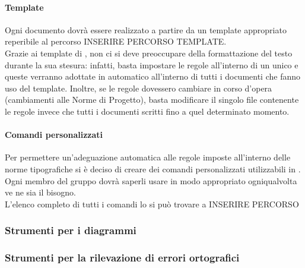 			\paragraph{Template}
				Ogni documento dovrà essere realizzato a partire da un template \latex{} appropriato reperibile al percorso INSERIRE PERCORSO TEMPLATE.\\
				Grazie ai template di \latex{}, non ci si deve preoccupare della formattazione del testo durante la sua stesura: infatti, basta impostare le regole all’interno di un unico e queste verranno adottate in automatico all’interno di tutti i documenti che fanno uso del template. Inoltre, se le regole dovessero cambiare in corso d’opera (cambiamenti alle Norme di Progetto), basta modificare il singolo file contenente le regole invece che tutti i documenti scritti fino a quel determinato momento.
			\paragraph{Comandi personalizzati}
				Per permettere un’adeguazione automatica alle regole imposte all’interno delle norme tipografiche si è deciso di creare dei comandi personalizzati utilizzabili in \latex{}. Ogni membro del gruppo dovrà saperli usare in modo appropriato ogniqualvolta ve ne sia il bisogno.\\
				L’elenco completo di tutti i comandi lo si può trovare a  INSERIRE PERCORSO
		\subsubsection{Strumenti per i diagrammi}
		\subsubsection{Strumenti per la rilevazione di errori ortografici}
